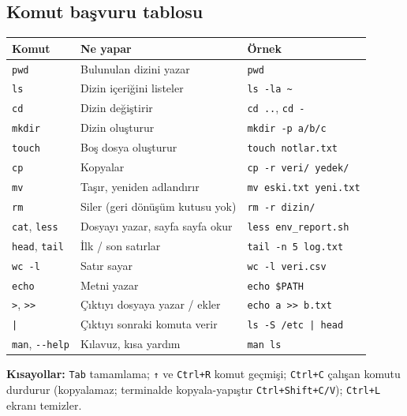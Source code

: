 \documentclass[11pt,a4paper]{article}
\begin{document}
\subsection{Komut başvuru tablosu}
\begin{center}
\begin{tabularx}{\textwidth}{@{}l Y l@{}}
\toprule
\textbf{Komut} & \textbf{Ne yapar} & \textbf{Örnek} \\
\midrule
\texttt{pwd} & Bulunulan dizini yazar & \texttt{pwd} \\
\texttt{ls} & Dizin içeriğini listeler & \texttt{ls -la \textasciitilde} \\
\texttt{cd} & Dizin değiştirir & \texttt{cd ..}, \texttt{cd -} \\
\texttt{mkdir} & Dizin oluşturur & \texttt{mkdir -p a/b/c} \\
\texttt{touch} & Boş dosya oluşturur & \texttt{touch notlar.txt} \\
\texttt{cp} & Kopyalar & \texttt{cp -r veri/ yedek/} \\
\texttt{mv} & Taşır, yeniden adlandırır & \texttt{mv eski.txt yeni.txt} \\
\texttt{rm} & Siler (geri dönüşüm kutusu yok) & \texttt{rm -r dizin/} \\
\texttt{cat}, \texttt{less} & Dosyayı yazar, sayfa sayfa okur & \texttt{less env\_report.sh} \\
\texttt{head}, \texttt{tail} & İlk / son satırlar & \texttt{tail -n 5 log.txt} \\
\texttt{wc -l} & Satır sayar & \texttt{wc -l veri.csv} \\
\texttt{echo} & Metni yazar & \texttt{echo \$PATH} \\
\texttt{>}, \texttt{>>} & Çıktıyı dosyaya yazar / ekler & \texttt{echo a >> b.txt} \\
\texttt{|} & Çıktıyı sonraki komuta verir & \texttt{ls -S /etc | head} \\
\texttt{man}, \texttt{-{}-help} & Kılavuz, kısa yardım & \texttt{man ls} \\
\bottomrule
\end{tabularx}
\end{center}
\textbf{Kısayollar:} \texttt{Tab} tamamlama; \texttt{↑} ve \texttt{Ctrl+R} komut geçmişi; \texttt{Ctrl+C} çalışan komutu durdurur (kopyalamaz; terminalde kopyala-yapıştır \texttt{Ctrl+Shift+C/V}); \texttt{Ctrl+L} ekranı temizler.
\end{document}
